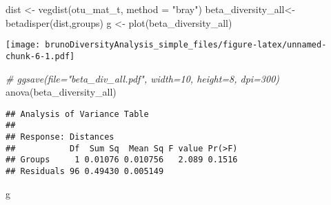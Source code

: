 \documentclass[
]{article}
\newenvironment{Shaded}{\begin{snugshade}}{\end{snugshade}}
\newcommand{\AttributeTok}[1]{\textcolor[rgb]{0.77,0.63,0.00}{#1}}
\newcommand{\CommentTok}[1]{\textcolor[rgb]{0.56,0.35,0.01}{\textit{#1}}}
\newcommand{\FunctionTok}[1]{\textcolor[rgb]{0.00,0.00,0.00}{#1}}
\newcommand{\NormalTok}[1]{#1}
\newcommand{\OtherTok}[1]{\textcolor[rgb]{0.56,0.35,0.01}{#1}}
\newcommand{\StringTok}[1]{\textcolor[rgb]{0.31,0.60,0.02}{#1}}
\begin{document}
\begin{Shaded}
\begin{Highlighting}[]
\NormalTok{dist }\OtherTok{\textless{}{-}} \FunctionTok{vegdist}\NormalTok{(otu\_mat\_t, }\AttributeTok{method =} \StringTok{"bray"}\NormalTok{)}
\NormalTok{beta\_diversity\_all}\OtherTok{\textless{}{-}}\FunctionTok{betadisper}\NormalTok{(dist,groups)}
\NormalTok{g }\OtherTok{\textless{}{-}} \FunctionTok{plot}\NormalTok{(beta\_diversity\_all)}
\end{Highlighting}
\end{Shaded}

\texttt{[image: brunoDiversityAnalysis\_simple\_files/figure-latex/unnamed-chunk-6-1.pdf]}

\begin{Shaded}
\begin{Highlighting}[]
\CommentTok{\# ggsave(file="beta\_div\_all.pdf", width=10, height=8, dpi=300)}
\FunctionTok{anova}\NormalTok{(beta\_diversity\_all)}
\end{Highlighting}
\end{Shaded}

\begin{verbatim}
## Analysis of Variance Table
## 
## Response: Distances
##           Df  Sum Sq  Mean Sq F value Pr(>F)
## Groups     1 0.01076 0.010756   2.089 0.1516
## Residuals 96 0.49430 0.005149
\end{verbatim}

\begin{Shaded}
\begin{Highlighting}[]
\NormalTok{g}
\end{Highlighting}
\end{Shaded}
\end{document}
